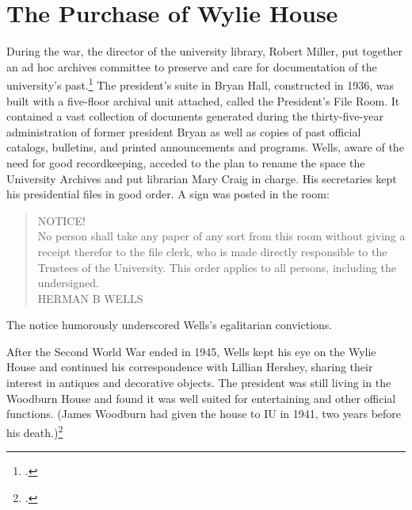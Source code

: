 \documentclass[
  american,
  letterpaper,
]{scrreprt}
\begin{document}
\section{The Purchase of Wylie House}\label{the-purchase-of-wylie-house}

During the war, the director of the university library, Robert Miller,
put together an ad hoc archives committee to preserve and care for
documentation of the university's past.\footnote{.} The president's
suite in Bryan Hall, constructed in 1936, was built with a five-floor
archival unit attached, called the President's File Room. It contained a
vast collection of documents generated during the thirty-five-year
administration of former president Bryan as well as copies of past
official catalogs, bulletins, and printed announcements and programs.
Wells, aware of the need for good recordkeeping, acceded to the plan to
rename the space the University Archives and put librarian Mary Craig in
charge. His secretaries kept his presidential files in good order. A
sign was posted in the room:

\begin{quote}
NOTICE!\\
No person shall take any paper of any sort from this room without giving
a receipt therefor to the file clerk, who is made directly responsible
to the Trustees of the University. This order applies to all persons,
including the undersigned.\\
HERMAN B WELLS
\end{quote}

The notice humorously underscored Wells's egalitarian convictions.

After the Second World War ended in 1945, Wells kept his eye on the
Wylie House and continued his correspondence with Lillian Hershey,
sharing their interest in antiques and decorative objects. The president
was still living in the Woodburn House and found it was well suited for
entertaining and other official functions. (James Woodburn had given the
house to IU in 1941, two years before his death.)\footnote{.}
\end{document}
